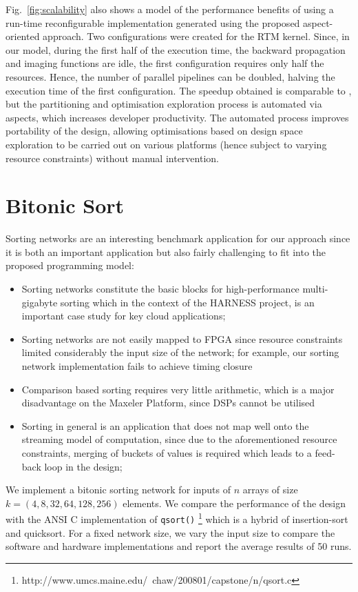 Fig.~\ref{fig:scalability} also shows a model of the performance
benefits of using a run-time reconfigurable implementation generated
using the proposed aspect-oriented approach. Two configurations were
created for the RTM \FAST{} kernel. Since, in our model, during the
first half of the execution time, the backward propagation and imaging
functions are idle, the first configuration requires only half the
resources. Hence, the number of parallel pipelines can be doubled,
halving the execution time of the first configuration. The speedup
obtained is comparable to \cite{Xinyu:Qiwei:Luk:Qiang:Pell:2012}, but
the partitioning and optimisation exploration process is automated via
aspects, which increases developer productivity. The automated process
improves portability of the design, allowing optimisations based on
design space exploration to be carried out on various platforms (hence
subject to varying resource constraints) without manual intervention.

\section{Bitonic Sort}

Sorting networks \cite{batcher1968sorting} are an interesting
benchmark application for our approach since it is both an important
application but also fairly challenging to fit into the proposed
programming model:
\begin{itemize}
\item Sorting networks constitute the basic blocks for
  high-performance multi-gigabyte sorting which in the context of the
  HARNESS project, is an important case study for key cloud
  applications;
\item Sorting networks are not easily mapped to FPGA since resource
  constraints limited considerably the input size of the network; for
  example, our sorting network implementation fails to achieve timing
  closure
\item Comparison based sorting requires very little arithmetic, which
  is a major disadvantage on the Maxeler Platform, since DSPs cannot
  be utilised
\item Sorting in general is an application that does not map well onto
  the streaming model of computation, since due to the aforementioned
  resource constraints, merging of buckets of values is required which
  leads to a feed-back loop in the design;
\end{itemize}

We implement a bitonic sorting network for inputs of $n$ arrays of
size $k = (4, 8, 32, 64, 128, 256)$ elements. We compare the
performance of the design with the ANSI C implementation of
\texttt{qsort()}
\footnote{http://www.umcs.maine.edu/~chaw/200801/capstone/n/qsort.c}
which is a hybrid of insertion-sort and quicksort. For a fixed network
size, we vary the input size to compare the software and hardware
implementations and report the average results of 50 runs.

